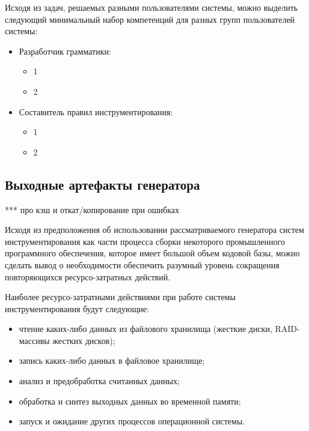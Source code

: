 Исходя из задач, решаемых разными пользователями системы, можно выделить следующий минимальный набор компетенций для разных групп пользователей системы:
\begin{itemize}[noitemsep]
  \item Разработчик грамматики:
    \begin{itemize}[noitemsep]
      \item 1
      \item 2
    \end{itemize}

  \item Составитель правил инструментирования:
    \begin{itemize}[noitemsep]
      \item 1
      \item 2
    \end{itemize}
\end{itemize}


\subsection{Выходные артефакты генератора}

***
про кэш и откат/копирование при ошибках

Исходя из предположения об использовании рассматриваемого генератора систем инструментирования как части процесса сборки некоторого промышленного программного обеспечения, которое имеет большой объем кодовой базы, можно сделать вывод о необходимости обеспечить разумный уровень сокращения повторяющихся ресурсо-затратных действий.

Наиболее ресурсо-затратными действиями при работе системы инструментирования будут следующие:
\begin{itemize}[noitemsep]
  \item чтение каких-либо данных из файлового хранилища (жесткие диски, RAID-массивы жестких дисков);
  \item запись каких-либо данных в файловое хранилище;
  \item анализ и предобработка считанных данных;
  \item обработка и синтез выходных данных во временной памяти;
  \item запуск и ожидание других процессов операционной системы.
\end{itemize}

